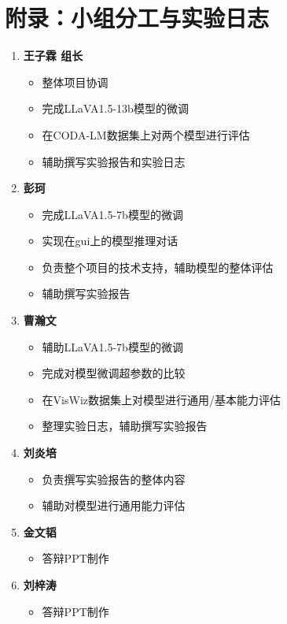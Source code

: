 \documentclass[
    linespread = 1.25
]{ctexart}
\begin{document}
\newpage
\section*{附录：小组分工与实验日志}

\begin{enumerate}
  \item \textbf{王子霖 \space 组长}
        \begin{itemize}
          \item 整体项目协调
          \item 完成LLaVA1.5-13b模型的微调
          \item 在CODA-LM数据集上对两个模型进行评估
          \item 辅助撰写实验报告和实验日志
        \end{itemize}

  \item \textbf{彭珂}
        \begin{itemize}
          \item 完成LLaVA1.5-7b模型的微调
          \item 实现在gui上的模型推理对话
          \item 负责整个项目的技术支持，辅助模型的整体评估
          \item 辅助撰写实验报告
        \end{itemize}

  \item \textbf{曹瀚文}
        \begin{itemize}
          \item 辅助LLaVA1.5-7b模型的微调
          \item 完成对模型微调超参数的比较
          \item 在VisWiz数据集上对模型进行通用/基本能力评估
          \item 整理实验日志，辅助撰写实验报告
        \end{itemize}

  \item \textbf{刘炎培}
        \begin{itemize}
          \item 负责撰写实验报告的整体内容
          \item 辅助对模型进行通用能力评估
        \end{itemize}

  \item \textbf{金文韬}
        \begin{itemize}
          \item 答辩PPT制作
        \end{itemize}
  \item \textbf{刘梓涛}
        \begin{itemize}
          \item 答辩PPT制作
        \end{itemize}


\end{enumerate}
\end{document}

